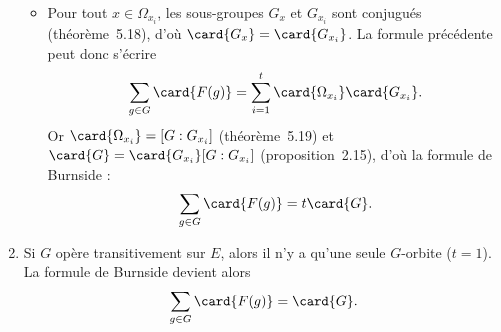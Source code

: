 \begin{enumerate}
\begin{itemize}
      \item
        Pour tout $x\in\Omega_{x_i}$, les sous-groupes $G_x$ et $G_{x_i}$ sont conjugués (théorème~5.18), d'où $\card{G_x} = \card{G_{x_i}}$.
        La formule précédente peut donc s'écrire
        \[
          \sum_{g\in G} \card{F(g)} = \sum_{i = 1}^t \card{\Omega_{x_i}} \card{G_{x_i}}.
        \]
        Or $\card{\Omega_{x_i}} = [G:G_{x_i}]$ (théorème~5.19) et $\card{G} = \card{G_{x_i}} [G:G_{x_i}]$ (proposition~2.15), d'où la formule de Burnside :
        \[
          \sum_{g\in G} \card{F(g)} = t \card{G}.
        \]
    \end{itemize}
  
  \item
    Si $G$ opère transitivement sur $E$, alors il n'y a qu'une seule $G$-orbite ($t = 1$). 
    La formule de Burnside devient alors
    \[
      \sum_{g\in G} \card{F(g)} = \card{G}.
    \]
\end{enumerate}
